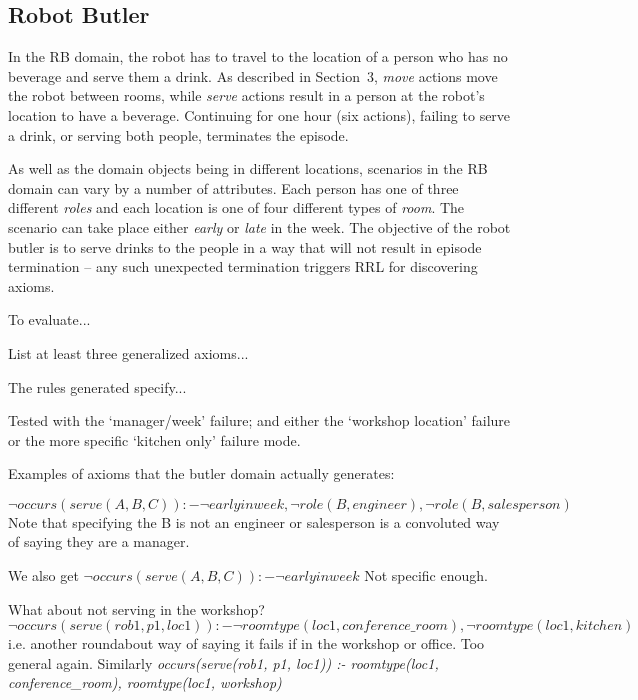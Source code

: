 


\subsection{Robot Butler}

In the RB domain, the robot has to travel to the location of a person who 
has no beverage and serve them a drink. As described in Section~3, 
\textit{move} actions move the robot between rooms, while \textit{serve} 
actions result in a person at the robot's location to have a beverage. 
Continuing for one hour (six actions), failing to serve a drink, or serving 
both people, terminates the episode.

As well as the domain objects being in different locations, scenarios in the RB 
domain can vary by a number of attributes. 
Each person has one of three different \textit{roles} and each location is one 
of four different types of \textit{room}. The scenario can take place either 
\textit{early} or \textit{late} in the week. 
The objective of the robot butler is to serve drinks to the people in a way 
that will not result in episode termination -- any such unexpected termination 
triggers RRL for discovering axioms.

To evaluate...

List at least three generalized axioms...

The rules generated specify...



Tested with the `manager/week' failure; and either the `workshop location' failure or the more specific `kitchen only' failure mode.

Examples of axioms that the butler domain actually generates:

$\neg occurs(serve(A,B,C)) :- \neg earlyinweek, \neg role(B,engineer), \neg role(B,salesperson)$
Note that specifying the B is not an engineer or salesperson is a convoluted way of saying they are a manager.

We also get
$\neg occurs(serve(A,B,C)) :- \neg earlyinweek$
Not specific enough.

What about not serving in the workshop?
$\neg occurs(serve(rob1, p1, loc1)) :- \neg roomtype(loc1, conference\_room), \neg roomtype(loc1, kitchen)$
i.e. another roundabout way of saying it fails if in the workshop or office. Too general again. Similarly
\textit{\neg occurs(serve(rob1, p1, loc1)) :- \neg roomtype(loc1, conference\_room), 
      \neg roomtype(loc1, workshop)}

